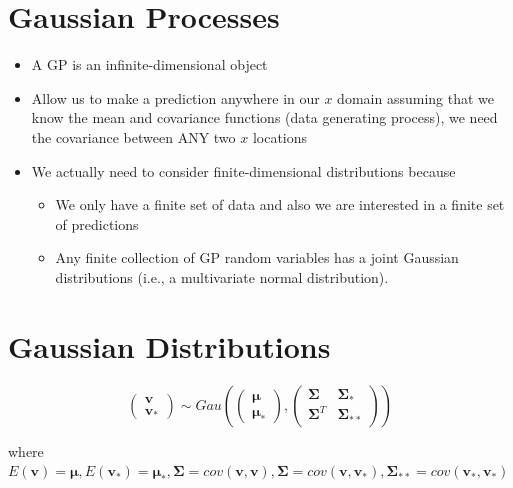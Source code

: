 \documentclass[
]{book}
\begin{document}
\hypertarget{gaussian-processes}{%
\section{Gaussian Processes}\label{gaussian-processes}}

\begin{itemize}
\item
  A GP is an infinite-dimensional object
\item
  Allow us to make a prediction anywhere in our \(x\) domain assuming that we know the mean and covariance functions (data generating process), we need the covariance between ANY two \(x\) locations
\item
  We actually need to consider finite-dimensional distributions because

  \begin{itemize}
  \item
    We only have a finite set of data and also we are interested in a finite set of predictions
  \item
    Any finite collection of GP random variables has a joint Gaussian distributions (i.e., a multivariate normal distribution).
  \end{itemize}
\end{itemize}

\hypertarget{gaussian-distributions}{%
\section{Gaussian Distributions}\label{gaussian-distributions}}

\[
\left(
\begin{array}
{c}
\mathbf{v} \\
\mathbf{v}_*
\end{array}
\right)
\sim 
Gau 
\left(
\left(
\begin{array}
{c}
\mathbf{\mu} \\
\mathbf{\mu}_*
\end{array}
\right),
\left(
\begin{array}
{cc}
\mathbf{\Sigma} & \mathbf{\Sigma}_* \\
\mathbf{\Sigma}^T & \mathbf{\Sigma}_{**}
\end{array}
\right)
\right)
\]

where \(E(\mathbf{v}) = \mathbf{\mu},E(\mathbf{v}_*) = \mathbf{\mu}_*, \mathbf{\Sigma}= cov(\mathbf{v}, \mathbf{v}), \mathbf{\Sigma}= cov(\mathbf{v}, \mathbf{v}_*),\mathbf{\Sigma}_{**} = cov(\mathbf{v}_*, \mathbf{v}_*)\)
\end{document}
